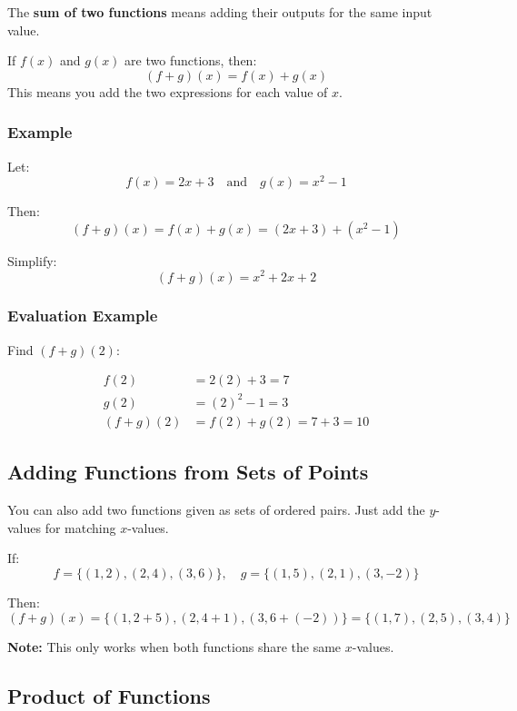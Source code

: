 \documentclass[11pt]{article}
\begin{document}
The \textbf{sum of two functions} means adding their outputs for the same input value.

\begin{tcolorbox}[colback=blue!5!white, colframe=blue!80!black, title=Sum of Functions]
If \( f(x) \) and \( g(x) \) are two functions, then:
\[
(f + g)(x) = f(x) + g(x)
\]
This means you add the two expressions for each value of \( x \).
\end{tcolorbox}

\subsubsection*{Example}

Let:
\[
f(x) = 2x + 3 \quad \text{and} \quad g(x) = x^2 - 1
\]

Then:
\[
(f + g)(x) = f(x) + g(x) = (2x + 3) + (x^2 - 1)
\]

Simplify:
\[
(f + g)(x) = x^2 + 2x + 2
\]

\subsubsection*{Evaluation Example}

Find \( (f + g)(2) \):

\begin{align*}
f(2) &= 2(2) + 3 = 7 \\
g(2) &= (2)^2 - 1 = 3 \\
(f + g)(2) &= f(2) + g(2) = 7 + 3 = 10
\end{align*}

\subsection{Adding Functions from Sets of Points}

You can also add two functions given as sets of ordered pairs. Just add the \( y \)-values for matching \( x \)-values.

\begin{tcolorbox}[colback=green!5!white, colframe=green!50!black, title=Adding Point-Based Functions]
If:
\[
f = \{ (1, 2), (2, 4), (3, 6) \}, \quad g = \{ (1, 5), (2, 1), (3, -2) \}
\]

Then:
\[
(f + g)(x) = \{ (1, 2+5), (2, 4+1), (3, 6+(-2)) \} = \{ (1, 7), (2, 5), (3, 4) \}
\]
\end{tcolorbox}

\textbf{Note:} This only works when both functions share the same \( x \)-values.
\subsection{Product of Functions}
\end{document}
